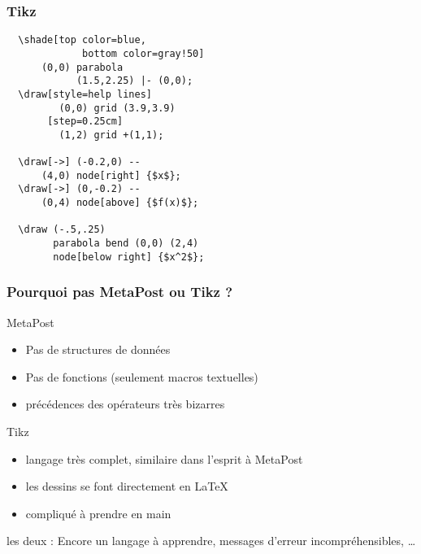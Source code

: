 \documentclass[nodefaultblocks]{beamer}
\begin{document}
\begin{frame}[fragile]\frametitle{Tikz}
  \begin{minipage}[]{0.45\textwidth}
  \footnotesize
  \begin{verbatim}
  \shade[top color=blue,
             bottom color=gray!50] 
      (0,0) parabola 
            (1.5,2.25) |- (0,0);
  \draw[style=help lines] 
         (0,0) grid (3.9,3.9)
       [step=0.25cm]      
         (1,2) grid +(1,1);

  \draw[->] (-0.2,0) -- 
      (4,0) node[right] {$x$};
  \draw[->] (0,-0.2) -- 
      (0,4) node[above] {$f(x)$};

  \draw (-.5,.25) 
        parabola bend (0,0) (2,4) 
        node[below right] {$x^2$};
  \end{verbatim}
  \end{minipage}
  \begin{minipage}[]{0.4\textwidth}
  \end{minipage}
\end{frame}

\begin{frame}\frametitle{Pourquoi pas MetaPost ou Tikz ?}
  \begin{block}{MetaPost}
    \begin{itemize}
      \item Pas de structures de données
      \item Pas de fonctions (seulement macros textuelles) 
      \item précédences des opérateurs très bizarres
    \end{itemize}
  \end{block}
  \begin{block}{Tikz}
    \begin{itemize}
      \item langage très complet, similaire dans l'esprit à MetaPost
      \item les dessins se font directement en \LaTeX
      \item compliqué à prendre en main 
    \end{itemize}
  \end{block}

  \medskip

  les deux : Encore un langage à apprendre, messages d'erreur
  incompréhensibles, \dots
\end{frame}
\end{document}
